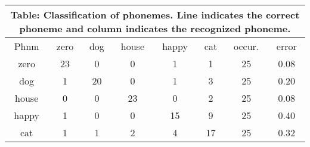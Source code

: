 \documentclass[10pt]{article}
\begin{document}
\tiny
\begin{tabular}{|@{}c@{}||@{}c@{}|@{}c@{}|@{}c@{}|@{}c@{}|@{}c@{}|@{}c@{}|@{}c@{}|}
\hline
\multicolumn{8}{c}{Table: Classification of phonemes. Line indicates the correct phoneme and column indicates the recognized phoneme.} \\ \hline \hline
Phnm & zero & dog & house & happy & cat & occur. & error \\ \hline
zero & 23 & 0 & 0 & 1 & 1 & 25 & 0.08 \\ \hline
dog & 1 & 20 & 0 & 1 & 3 & 25 & 0.20 \\ \hline
house & 0 & 0 & 23 & 0 & 2 & 25 & 0.08 \\ \hline
happy & 1 & 0 & 0 & 15 & 9 & 25 & 0.40 \\ \hline
cat & 1 & 1 & 2 & 4 & 17 & 25 & 0.32 \\ \hline
\end{tabular}
\end{document}
